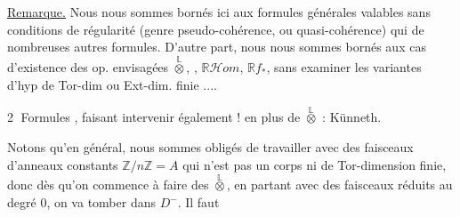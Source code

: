 \uline{Remarque.} Nous nous sommes bornés ici aux formules générales valables sans conditions de régularité (genre pseudo-cohérence, ou quasi-cohérence) qui  de nombreuses autres formules. D'autre part, nous nous sommes bornés aux cas d'existence  des op. envisagées $\overset{\mathbb L}{\otimes}$, , $\mathbb R\mathcal Hom$, $\mathbb Rf_*$, sans examiner les variantes  d'hyp de Tor-dim ou Ext-dim. finie ....


\textcircled{2} Formules , faisant intervenir également $!$ en plus de $\overset{\mathbb L}{\otimes}$ : Künneth.


Notons qu'en général, nous sommes obligés de travailler avec des faisceaux d'anneaux constants $\mathbb Z/n\mathbb Z=A$ qui n'est pas un corps ni de Tor-dimension  finie, donc dès qu'on commence à faire des $\overset{\mathbb L}{\otimes}$,  en partant avec des faisceaux réduits au degré $0$, on va tomber dans $D^-$. Il faut
